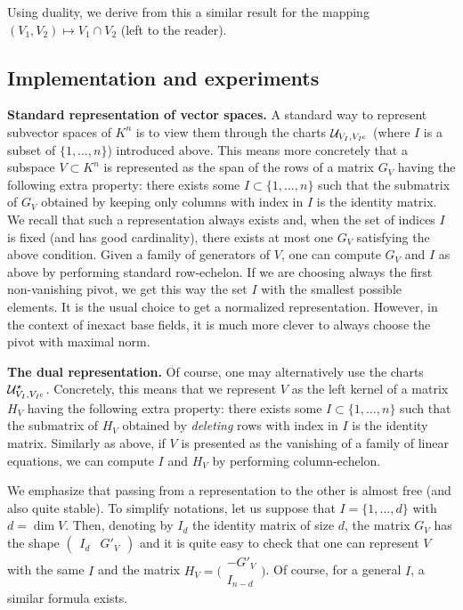 \documentclass{sig-alternate}
\begin{document}
Using duality, we derive from this a similar result for the mapping 
$(V_1, V_2) \mapsto V_1 \cap V_2$ (left to the reader).

\subsection{Implementation and experiments}

\noindent
{\bf Standard representation of vector spaces.}
A standard way to represent subvector spaces of $K^n$ is to view them 
through the charts $\mathcal U_{V_I, V_{I^{\text{\rm c}}}}$ (where $I$ is a subset 
of $\{1, \ldots, n\}$) introduced above. This means more concretely 
that a subspace $V \subset K^n$ is represented as the span of the rows
of a matrix $G_V$ having the following extra property: there 
exists some $I \subset \{1, \ldots, n\}$ such that the submatrix of 
$G_V$ obtained by keeping only columns with index in $I$ is the identity 
matrix. We recall that such a representation always exists and, when 
the set of indices $I$ is fixed (and has good cardinality), there 
exists at most one $G_V$ satisfying the above condition.
Given a family of generators of $V$, one can compute $G_V$ and $I$ as 
above by performing standard row-echelon. If we are choosing always the 
first non-vanishing pivot, we get this way the set $I$ with the smallest 
possible elements. It is the usual choice to get a normalized 
representation. However, in the context of inexact base fields, it is 
much more clever to always choose the pivot with maximal norm.

\medskip

\noindent
{\bf The dual representation.}
Of course, one may alternatively use the charts $\mathcal U^\star_{V_I, 
V_{I^{\text{\rm c}}}}$. Concretely, this means that we represent $V$ as the left 
kernel of a matrix $H_V$ having the following extra property: there 
exists some $I \subset \{1, \ldots, n\}$ such that the submatrix of 
$H_V$ obtained by \emph{deleting} rows with index in $I$ is the identity 
matrix. Similarly as above, if $V$ is presented as the vanishing of a 
family of linear equations, we can compute $I$ and $H_V$ by performing 
column-echelon.

We emphasize that passing from a representation to the other is almost 
free (and also quite stable). To simplify notations, let us suppose 
that $I = \{1, \ldots, d\}$ with $d = \dim V$. Then, denoting by $I_d$ 
the identity matrix of size $d$, the matrix $G_V$ has the shape
$(\begin{matrix} I_d & G'_V \end{matrix})$
and it is quite easy to check that one can represent $V$ with the same
$I$ and the matrix
$H_V = \Big(\begin{matrix} -G'_V \\ I_{n-d} \end{matrix}\Big)$. Of
course, for a general $I$, a similar formula exists.
\end{document}
